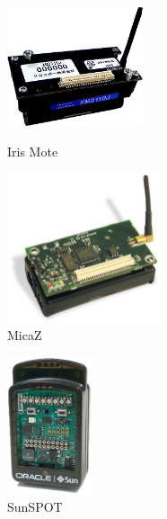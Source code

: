 \begin{figure}[htbp]
 \begin{minipage}{0.5\hsize} \begin{center}
     \includegraphics[width=40mm]{./images/iris_mote.eps}
    \end{center}
    \caption{Iris Mote}
    \label{fig:iris_mote}
 \end{minipage}
 \begin{minipage}{0.5\hsize}
    \begin{center}
     \includegraphics[width=45mm]{./images/micaz.eps}
    \end{center}
    \caption{MicaZ}
    \label{fig:micaz}
 \end{minipage}
\end{figure}

\begin{figure}[htbp]
 \begin{center}
  \includegraphics[width=25mm]{./images/sunspot.eps}
 \end{center}
 \caption{SunSPOT}
 \label{fig:sunspot}
\end{figure}





